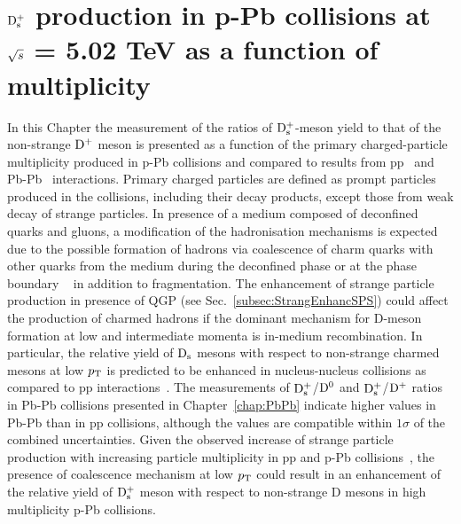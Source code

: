 \chapter{${\rm D_s^+}$ production in p-Pb collisions at $\sqrt{s}$ = 5.02 TeV as a function of multiplicity}
\label{chap:chap6}

In this Chapter the measurement of the ratios of ${\rm D_s^+}$-meson yield to that of the 
non-strange ${\rm D^+}$ meson is presented as a function of the primary
charged-particle multiplicity produced in p-Pb collisions and compared to results from 
pp~\cite{Acharya:2017jgo} and Pb-Pb~\cite{ALICE-PUBLIC-2017-003} interactions. Primary charged particles are defined as prompt
particles produced in the collisions, including their decay products,
except those from weak decay of strange particles.
In presence of a medium 
composed of deconfined quarks and gluons, a modification of the hadronisation 
mechanisms is expected due to the possible formation of hadrons via
coalescence of charm quarks with other quarks from the 
medium during the deconfined phase or at the phase boundary
~\cite{Greco:2003mm,Greco:2003vf, Andronic:2007zu, He:2012df} in addition to
fragmentation. The enhancement of strange particle production in presence of QGP 
(see Sec.~\ref{subsec:StrangEnhancSPS}) could affect the production of charmed hadrons if 
the dominant mechanism for D-meson formation at low and 
intermediate momenta is in-medium recombination. 
In particular, the relative yield of ${\rm D_s}$ 
mesons with respect to non-strange charmed mesons at low $p_{\rm T}$ is 
predicted to be enhanced in nucleus-nucleus collisions as compared to pp 
interactions~\cite{Andronic2003,RafelskiKuznetsova,HeFriesRapp}.
The measurements of ${\rm D_s^+}$/${\rm D^0}$ and ${\rm D_s^+}$/${\rm D^+}$ ratios in Pb-Pb collisions presented in 
Chapter~\ref{chap:PbPb} indicate higher values in Pb-Pb than in pp collisions, although
the values are compatible within $1\sigma$ of the combined uncertainties.
Given the observed increase of strange particle production with increasing particle multiplicity
in pp and p-Pb collisions~\cite{Abelev:2013haa,Adam:2015vsf,ALICE:2017jyt}, the presence of 
coalescence mechanism at low $p_{\rm T}$ could result in an enhancement 
of the relative yield of ${\rm D_s^+}$ meson with respect to non-strange
D mesons in high multiplicity p-Pb collisions.


